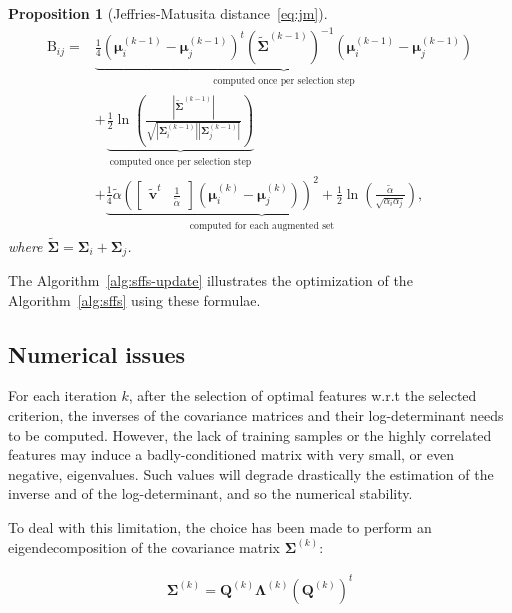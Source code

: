 \documentclass[journal]{IEEEtran}
\newtheorem{prop}{Proposition}
\begin{document}
      \begin{prop}[Jeffries-Matusita distance~\ref{eq:jm}]
      \begin{align}
        \label{eq:jm-update}
            \text{B}_{ij} = &\underbrace{\frac{1}{4} (\boldsymbol{\mu}_i^{(k-1)} - \boldsymbol{\mu}_j^{(k-1)})^t ( \boldsymbol{\tilde{\Sigma}}^{(k-1)} )^{-1} (\boldsymbol{\mu}_i^{(k-1)} - \boldsymbol{\mu}_j^{(k-1)})}_{\substack{\text{computed once per selection step}}} \nonumber \\
            &+ \underbrace{\frac{1}{2} \ln \left( \frac{|\boldsymbol{\tilde{\Sigma}}^{(k-1)}|}{\sqrt{|\boldsymbol{\Sigma}_i^{(k-1)}| |\boldsymbol{\Sigma}_j^{(k-1)}|}} \right)}_{\substack{\text{computed once per selection step}}} \nonumber \\
            &+ \underbrace{\frac{1}{4} \tilde{\alpha} ( \left[\begin{array}{cc} \mathbf{\tilde{v}}^t & \frac{1}{\tilde{\alpha}} \end{array}\right] (\boldsymbol{\mu}_{i}^{(k)} - \boldsymbol{\mu}_{j}^{(k)}) )^2 + \frac{1}{2} \ln \left( \frac{\tilde{\alpha}}{\sqrt{\alpha_i \alpha_j}} \right)}_{\substack{\text{computed for each augmented set}}},
      \end{align}
      where $\boldsymbol{\tilde{\Sigma}} = \boldsymbol{\Sigma}_i + \boldsymbol{\Sigma}_j$.
    \end{prop}
    
    The  Algorithm~\ref{alg:sffs-update} illustrates  the optimization
    of the Algorithm~\ref{alg:sffs} using these formulae.

    \subsection{Numerical issues}
    For each  iteration $k$, after  the selection of  optimal features
    w.r.t  the  selected criterion,  the  inverses  of the  covariance
    matrices and their log-determinant  needs to be computed. However,
    the lack of training samples or the highly correlated features may
    induce  a  badly-conditioned  matrix  with  very  small,  or  even
    negative, eigenvalues.   Such values will degrade  drastically the
    estimation of the  inverse and of the log-determinant,  and so the
    numerical stability.

    To deal with this limitation, the choice has been made to perform an eigendecomposition of the covariance matrix $\boldsymbol{\Sigma}^{(k)}$:

    \begin{eqnarray}
    \boldsymbol{\Sigma}^{(k)} = \mathbf{Q}^{(k)} \boldsymbol{\Lambda}^{(k)} (\mathbf{Q}^{(k)})^t\label{eq:eigendecomp}
    \end{eqnarray}
\end{document}
